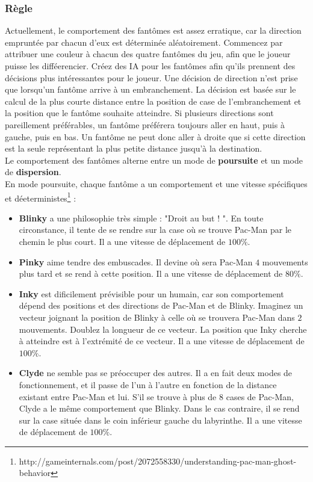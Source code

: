 \documentclass[12pt,a4paper,final]{article}
\begin{document}
\subsubsection{Règle}
Actuellement, le comportement des fantômes est assez erratique, car la direction empruntée par chacun d'eux est déterminée aléatoirement. Commencez par attribuer une couleur à chacun des quatre fantômes du jeu, afin que le joueur puisse les difféerencier. Créez des IA pour les fantômes afin qu'ils prennent des décisions
plus intéressantes pour le joueur. Une décision de direction n'est prise que lorsqu'un fantôme arrive à un embranchement. La décision est basée sur le calcul de la plus courte distance entre la position de case de l'embranchement et la position que le fantôme souhaite atteindre. Si plusieurs directions sont pareillement préférables, un fantôme préférera toujours aller en haut, puis à gauche, puis en bas. Un fantôme ne peut donc aller à droite que si cette direction est la seule représentant la plus petite distance jusqu'à la destination.\\
Le comportement des fantômes alterne entre un mode de \textbf{poursuite} et un mode de \textbf{dispersion}.\\
En mode poursuite, chaque fantôme a un comportement et une vitesse spécifiques et déeterministes\footnote{http://gameinternals.com/post/2072558330/understanding-pac-man-ghost-behavior} :
\begin{itemize}
\item \textbf{Blinky} a une philosophie très simple : "Droit au but ! ". En toute circonstance, il tente de se rendre
sur la case où se trouve Pac-Man par le chemin le plus court. Il a une vitesse de déplacement de $100\%$.
\item \textbf{Pinky} aime tendre des embuscades. Il devine où sera Pac-Man $4$ mouvements plus tard et se rend à
cette position. Il a une vitesse de déplacement de $80\%$.
\item \textbf{Inky} est dificilement prévisible pour un humain, car son comportement dépend des positions et des
directions de Pac-Man et de Blinky. Imaginez un vecteur joignant la position de Blinky à celle où
se trouvera Pac-Man dans $2$ mouvements. Doublez la longueur de ce vecteur. La position que Inky
cherche à atteindre est à l'extrémité de ce vecteur. Il a une vitesse de déplacement de $100\%$.
\item \textbf{Clyde} ne semble pas se préoccuper des autres. Il a en fait deux modes de fonctionnement, et il passe de l'un à l'autre en fonction de la distance existant entre Pac-Man et lui. S'il se trouve à plus de $8$
cases de Pac-Man, Clyde a le même comportement que Blinky. Dans le cas contraire, il se rend sur la
case située dans le coin inférieur gauche du labyrinthe. Il a une vitesse de déplacement de $100\%$.
\end{itemize}
\end{document}

